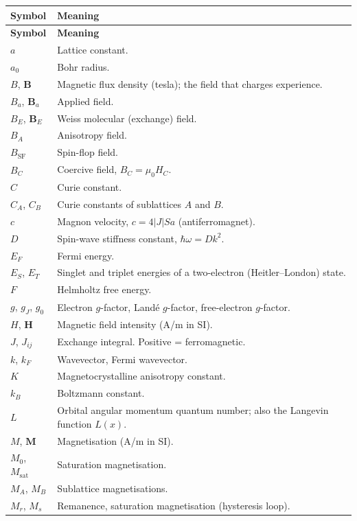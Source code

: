 \documentclass[11pt,a4paper]{article}
\newcommand{\vb}[1]{\mathbf{#1}}
\begin{document}
\begin{longtable}{p{2.4cm} p{12.6cm}}
\toprule
\textbf{Symbol} & \textbf{Meaning} \\
\midrule
\endfirsthead
\toprule
\textbf{Symbol} & \textbf{Meaning} \\
\midrule
\endhead
\bottomrule
\endfoot
$a$ & Lattice constant. \\
$a_0$ & Bohr radius. \\
$B$, $\vb{B}$ & Magnetic flux density (tesla); the field that charges experience. \\
$B_a$, $\vb{B}_a$ & Applied field. \\
$B_E$, $\vb{B}_E$ & Weiss molecular (exchange) field. \\
$B_A$ & Anisotropy field. \\
$B_{\mathrm{SF}}$ & Spin-flop field. \\
$B_C$ & Coercive field, $B_C = \mu_0 H_C$. \\
$C$ & Curie constant. \\
$C_A$, $C_B$ & Curie constants of sublattices $A$ and $B$. \\
$c$ & Magnon velocity, $c = 4|J|Sa$ (antiferromagnet). \\
$D$ & Spin-wave stiffness constant, $\hbar\omega = Dk^2$. \\
$E_F$ & Fermi energy. \\
$E_S$, $E_T$ & Singlet and triplet energies of a two-electron (Heitler--London) state. \\
$F$ & Helmholtz free energy. \\
$g$, $g_J$, $g_0$ & Electron $g$-factor, Land\'e $g$-factor, free-electron $g$-factor. \\
$H$, $\vb{H}$ & Magnetic field intensity (A/m in SI). \\
$J$, $J_{ij}$ & Exchange integral. Positive = ferromagnetic. \\
$k$, $k_F$ & Wavevector, Fermi wavevector. \\
$K$ & Magnetocrystalline anisotropy constant. \\
$k_B$ & Boltzmann constant. \\
$L$ & Orbital angular momentum quantum number; also the Langevin function $L(x)$. \\
$M$, $\vb{M}$ & Magnetisation (A/m in SI). \\
$M_0$, $M_{\mathrm{sat}}$ & Saturation magnetisation. \\
$M_A$, $M_B$ & Sublattice magnetisations. \\
$M_r$, $M_s$ & Remanence, saturation magnetisation (hysteresis loop). \\

\end{longtable}
\end{document}
